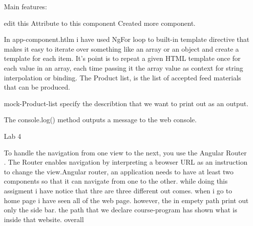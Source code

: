 Main features:

edit this Attribute to this component Created more component.

In app-component.htlm  i have used NgFor loop to built-in template directive that makes it easy to iterate over something like an array or an object and create a template for each item.
It's point is to repeat a given HTML template once for each value in an array, each time passing it the array value as context for string interpolation or binding.
The Product list, is the list of accepted feed materials
that can be produced.

mock-Product-list specify the describtion that we want to print out as an output.

The console.log() method outputs a message to the web console. 





Lab 4

To handle the navigation from one view to the next, you use the Angular Router . The Router enables navigation by interpreting a browser URL as an instruction to change the view.Angular router, an application needs to have at least two components so that it can navigate from one to the other. while doing this assigment i have notice that thre are three different  out comes.
when i go to home page i have seen all of the web page. however, the in empety path print out only the side bar. the path that we declare course-program has shown what is inside that website.
overall 